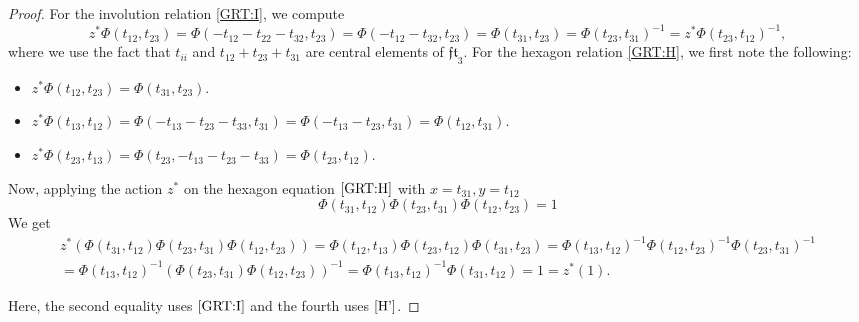 \documentclass[10pt,a4paper]{amsart}
\newcommand{\fft}{\mathfrak{ft}}
\begin{document}
\begin{proof}
For the involution relation \eqref{GRT:I}, we compute \[z^* \Phi(t_{12},t_{23}) = \Phi(-t_{12}-t_{22}-t_{32},t_{23}) = \Phi(-t_{12}-t_{32},t_{23}) = \Phi(t_{31},t_{23}) = \Phi(t_{23},t_{31})^{-1} = z^*\Phi(t_{23},t_{12})^{-1},\]
where we use the fact that $t_{ii}$ and $t_{12}+t_{23}+t_{31}$ are central elements of $\fft_3$. For the hexagon relation \eqref{GRT:H}, we first note the following: 
\begin{itemize}
    \item $z^* \Phi(t_{12},t_{23}) = \Phi(t_{31},t_{23})$.
    \item $z^*\Phi(t_{13},t_{12}) = \Phi(-t_{13}-t_{23}-t_{33}, t_{31}) = \Phi(-t_{13}-t_{23}, t_{31}) = \Phi(t_{12}, t_{31})$.
    \item $z^* \Phi(t_{23},t_{13}) = \Phi(t_{23},-t_{13}-t_{23}-t_{33}) = \Phi(t_{23}, t_{12})$.
\end{itemize}
Now, applying the action $z^*$ on the hexagon equation $\eqref{GRT:H}$ with $x = t_{31}, y = t_{12}$ 
    \begin{equation} \label{H'}
        \Phi(t_{31}, t_{12}) \Phi(t_{23}, t_{31}) \Phi(t_{12}, t_{23}) = 1
    \end{equation}
We get
    \begin{equation*}
        \begin{aligned}
	z^* \left( \Phi(t_{31}, t_{12}) \Phi(t_{23}, t_{31}) \Phi(t_{12}, t_{23})\right) = \Phi(t_{12}, t_{13}) \Phi(t_{23}, t_{12}) \Phi(t_{31}, t_{23})
	 = \Phi(t_{13}, t_{12})^{-1} \Phi(t_{12}, t_{23})^{-1} \Phi(t_{23}, t_{31})^{-1} \\
	 = \Phi(t_{13}, t_{12})^{-1} \left(\Phi(t_{23}, t_{31})  \Phi(t_{12}, t_{23})\right)^{-1}
     =  \Phi(t_{13}, t_{12})^{-1} \Phi(t_{31},t_{12})
      =  1 =  z^*(1).
    \end{aligned}
    \end{equation*}

Here, the second equality uses $\eqref{GRT:I}$ and the fourth uses $\eqref{H'}$.
\end{proof}
\end{document}
